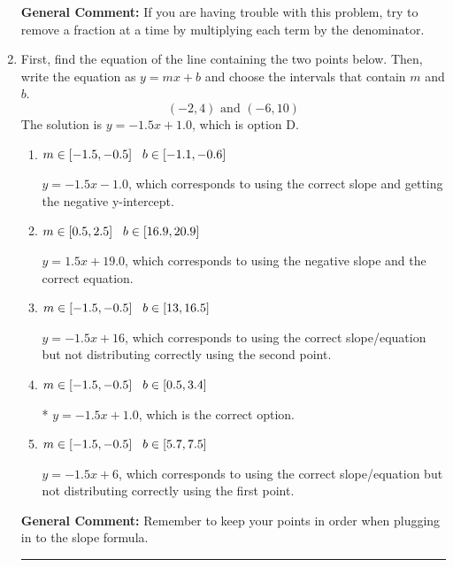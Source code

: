 \documentclass{extbook}[14pt]
\newcommand{\litem}[1]{\item #1

\rule{\textwidth}{0.4pt}}
\begin{document}
\begin{enumerate}
{\textbf{General Comment:} If you are having trouble with this problem, try to remove a fraction at a time by multiplying each term by the denominator.
}
\litem{
First, find the equation of the line containing the two points below. Then, write the equation as $ y=mx+b $ and choose the intervals that contain $m$ and $b$.
\[ (-2, 4) \text{ and } (-6, 10) \]The solution is \( y = -1.5x + 1.0 \), which is option D.\begin{enumerate}[label=\Alph*.]
\item \( m \in [-1.5, -0.5] \hspace*{3mm} b \in [-1.1, -0.6] \)

 $y = -1.5x -1.0$, which corresponds to using the correct slope and getting the negative y-intercept.
\item \( m \in [0.5, 2.5] \hspace*{3mm} b \in [16.9, 20.9] \)

 $y = 1.5x + 19.0$, which corresponds to using the negative slope and the correct equation.
\item \( m \in [-1.5, -0.5] \hspace*{3mm} b \in [13, 16.5] \)

 $y = -1.5x + 16$, which corresponds to using the correct slope/equation but not distributing correctly using the second point.
\item \( m \in [-1.5, -0.5] \hspace*{3mm} b \in [0.5, 3.4] \)

* $y = -1.5x + 1.0$, which is the correct option.
\item \( m \in [-1.5, -0.5] \hspace*{3mm} b \in [5.7, 7.5] \)

 $y = -1.5x + 6$, which corresponds to using the correct slope/equation but not distributing correctly using the first point.
\end{enumerate}

\textbf{General Comment:} Remember to keep your points in order when plugging in to the slope formula.
}
\end{enumerate}
\end{document}
